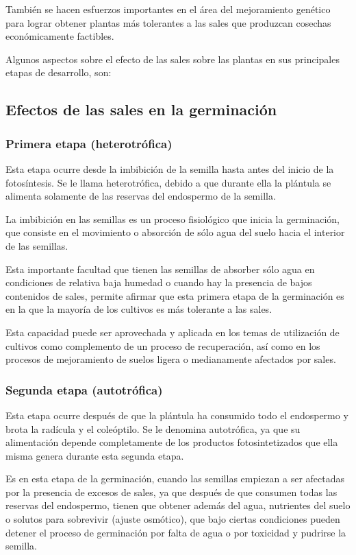 También se hacen esfuerzos importantes en el área del mejoramiento genético para lograr obtener plantas más tolerantes a las sales que produzcan cosechas económicamente factibles.

Algunos aspectos sobre el efecto de las sales sobre las plantas en sus principales etapas de desarrollo, son:

\subsection{Efectos de las sales en la germinación}

\subsubsection{Primera etapa (heterotrófica)}
Esta etapa ocurre desde la imbibición de la semilla hasta antes del inicio de la fotosíntesis. Se le llama heterotrófica, debido a que durante ella la plántula se alimenta solamente de las reservas del endospermo de la semilla.

La imbibición en las semillas es un proceso fisiológico que inicia la germinación, que consiste en el movimiento o absorción de sólo agua del suelo hacia el interior de las semillas.

Esta importante facultad que tienen las semillas de absorber sólo agua en condiciones de relativa baja humedad o cuando hay la presencia de bajos contenidos de sales, permite afirmar que esta primera etapa de la germinación es en la que la mayoría de los cultivos es más tolerante a las sales.

Esta capacidad puede ser aprovechada y aplicada en los temas de utilización de cultivos como complemento de un proceso de recuperación, así como en los procesos de mejoramiento de suelos ligera o medianamente afectados por sales.
\subsubsection{Segunda etapa (autotrófica)}

Esta etapa ocurre después de que la plántula ha consumido todo el endospermo y brota la radícula y el coleóptilo. Se le denomina autotrófica, ya que su alimentación depende completamente de los productos fotosintetizados que ella misma genera durante esta segunda etapa.

Es en esta etapa de la germinación, cuando las semillas empiezan a ser afectadas por la presencia de excesos de sales, ya que después de que consumen todas las reservas del endospermo, tienen que obtener además del agua, nutrientes del suelo o solutos para sobrevivir (ajuste osmótico), que bajo ciertas condiciones pueden detener el proceso de germinación por falta de agua o por toxicidad y pudrirse la semilla.

